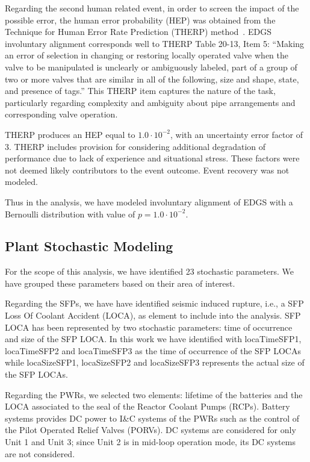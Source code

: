 Regarding the second human related event, in order to screen the impact of the possible error, 
the human error probability 
(HEP) was obtained from the Technique for Human Error Rate Prediction (THERP) 
method~\cite{NUREGCR1278}. 
EDGS involuntary alignment corresponds well to THERP Table 20-13, Item 5: ``Making an error 
of selection in changing or restoring locally operated valve when the valve to be manipulated 
is unclearly or ambiguously labeled, part of a group of two or more valves that are similar in 
all of the following, size and shape, state, and presence of tags.'' This THERP item captures 
the nature of the task, particularly regarding complexity and ambiguity about pipe arrangements 
and corresponding valve operation. 

THERP produces an HEP equal to $1.0 \cdot 10^{-2}$, with an uncertainty 
error factor of 3. THERP includes provision for considering additional degradation of performance 
due to lack of experience and situational stress. These factors were not deemed likely contributors 
to the event outcome. Event recovery was not modeled.

Thus in the analysis, we have modeled involuntary alignment of EDGS with a Bernoulli 
distribution with value of $p=1.0 \cdot 10^{-2}$.

\subsection{Plant Stochastic Modeling}
\label{sec:plantStochasticModeling}
For the scope of this analysis, we have identified 23 stochastic parameters. We have 
grouped these parameters based on their area of interest.

Regarding the SFPs, we have have identified seismic induced rupture, i.e., a SFP Loss Of
Coolant Accident (LOCA), as 
element to include into the analysis. SFP LOCA has been represented by two stochastic 
parameters: time of occurrence and size of the SFP LOCA. In this work we have identified 
with locaTimeSFP1, locaTimeSFP2 and locaTimeSFP3 as the time of occurrence of the SFP 
LOCAs while locaSizeSFP1, locaSizeSFP2 and locaSizeSFP3 represents the actual size of 
the SFP LOCAs.

Regarding the PWRs, we selected two elements: lifetime of the batteries and the LOCA 
associated to the seal of the Reactor Coolant Pumps (RCPs). Battery systems provides 
DC power to I\&C systems 
of the PWRs such as the control of the Pilot Operated Relief Valves (PORVs).
DC systems are considered for only 
Unit 1 and Unit 3; since Unit 2 is in mid-loop operation mode, its DC systems are not 
considered.


